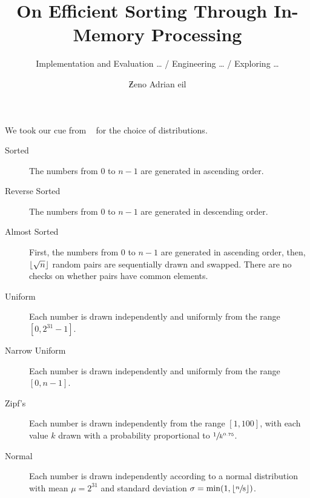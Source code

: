 \documentclass[draft, british, twoside]{../garticle}
\title{On Efficient Sorting Through In-Memory Processing}
\subtitle{Implementation and Evaluation \dots{} / Engineering \dots{} / Exploring \dots{}}
\author{\texorpdfstring{Ƶ}{Z}eno Adrian \texorpdfstring{\Lss05{W\kern-1.5pt}}{W}eil}
\begin{document}


%	

	\tableofcontents

	\listoftodos

	\begingroup
	\endgroup

	\bigskip

	We took our cue from \citeauthor{axtmann2020engineering}~\cite{axtmann2020engineering} for the choice of distributions.
	\begin{description}
		\item[Sorted]
		The numbers from \(0\) to \(n - 1\) are generated in ascending order.

		\item[Reverse Sorted]
		The numbers from \(0\) to \(n - 1\) are generated in descending order.

		\item[Almost Sorted]
		First, the numbers from \(0\) to \(n - 1\) are generated in ascending order, then, \(\lfloor\sqrt{n}\rfloor\) random pairs are sequentially drawn and swapped.
		There are no checks on whether pairs have common elements.

		\item[Uniform]
		Each number is drawn independently and uniformly from the range \([0, 2^{31} - 1]\).

		\item[Narrow Uniform]
		Each number is drawn independently and uniformly from the range \([0, n - 1]\).

		\item[Zipf's]
		Each number is drawn independently from the range \([1, 100]\), with each value \(k\) drawn with a probability proportional to \(\sfrac{1}{k^{0.75}}\).

		\item[Normal]
		Each number is drawn independently according to a normal distribution with mean \(\mu = 2^{31}\) and standard deviation \(\sigma = \min\paren*{1, \floor*{\sfrac{n}{8}}}\).
	\end{description}

	

	\appendix

	

	\mybibliography[heading=bibintoc]
\end{document}
